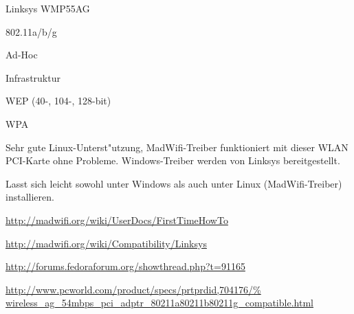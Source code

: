 %
%
\begin{wlandevice}{Linksys WMP55AG}



\begin{wlanieeestandard}
\item 802.11a/b/g
\end{wlanieeestandard}

\begin{wlanmode}
\item Ad-Hoc
\item Infrastruktur
\end{wlanmode}

\begin{wlansecurity}
\item WEP (40-, 104-, 128-bit)
\item WPA
\end{wlansecurity}

\begin{wlandriver}
\item
Sehr gute Linux-Unterst"utzung, MadWifi-Treiber funktioniert
mit dieser WLAN PCI-Karte ohne Probleme.
Windows-Treiber werden von Linksys bereitgestellt.
\end{wlandriver}


\begin{wlaninstall}
\item
Lasst sich leicht sowohl unter Windows als auch unter Linux (MadWifi-Treiber)
installieren.

\url{http://madwifi.org/wiki/UserDocs/FirstTimeHowTo}
\end{wlaninstall}

\begin{wlanlink}
\item \url{http://madwifi.org/wiki/Compatibility/Linksys}
\item \url{http://forums.fedoraforum.org/showthread.php?t=91165}
\item \url{http://www.pcworld.com/product/specs/prtprdid,704176/%
	wireless_ag_54mbps_pci_adptr_80211a80211b80211g_compatible.html}
\end{wlanlink}

\end{wlandevice}

